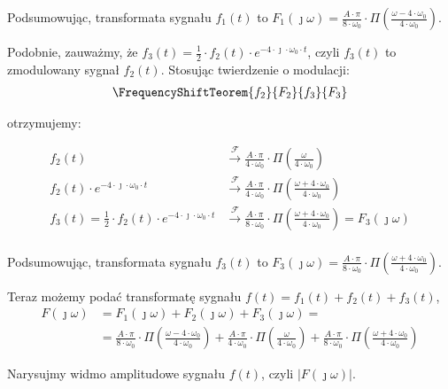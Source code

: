 \begin{task}
Podsumowując, transformata sygnału $f_1(t)$ to $F_1(\jmath \omega)= \frac{A \cdot \pi}{8 \cdot \omega_0} \cdot \Pi \left(\frac{\omega - 4 \cdot \omega_0}{4 \cdot \omega_0}\right)$.

Podobnie, zauważmy, że $f_3(t)=\frac{1}{2} \cdot f_2(t) \cdot e^{-4 \cdot \jmath \cdot \omega_0 \cdot t}$, czyli $f_3(t)$ to zmodulowany sygnał $f_2(t)$. Stosując twierdzenie o modulacji:
\begin{align*}
\FrequencyShiftTeorem{f_2}{F_2}{f_3}{F_3}
\end{align*}

otrzymujemy:

\begin{align*}
f_2(t) &\xrightarrow{\mathcal F} \frac{A \cdot \pi}{4 \cdot \omega_0} \cdot \Pi \left(\frac{\omega}{4 \cdot \omega_0}\right)\\
f_2(t) \cdot e^{-4 \cdot \jmath \cdot \omega_0 \cdot t} &\xrightarrow{\mathcal F} \frac{A \cdot \pi}{4 \cdot \omega_0} \cdot \Pi \left(\frac{\omega + 4 \cdot \omega_0}{4 \cdot \omega_0}\right)\\
f_3(t) = \frac{1}{2} \cdot f_2(t) \cdot e^{-4 \cdot \jmath \cdot \omega_0 \cdot t} &\xrightarrow{\mathcal F} \frac{A \cdot \pi}{8 \cdot \omega_0} \cdot \Pi \left(\frac{\omega + 4 \cdot \omega_0}{4 \cdot \omega_0}\right) = F_3(\jmath \omega)\\
\end{align*}

Podsumowując, transformata sygnału $f_3(t)$ to $F_3(\jmath \omega)= \frac{A \cdot \pi}{8 \cdot \omega_0} \cdot \Pi \left(\frac{\omega + 4 \cdot \omega_0}{4 \cdot \omega_0}\right)$.

Teraz możemy podać transformatę sygnału $f(t) = f_1(t)+f_2(t)+f_3(t)$,
\begin{align*}
F(\jmath \omega)&=F_1(\jmath \omega)+F_2(\jmath \omega)+F_3(\jmath \omega)=\\
&=\frac{A \cdot \pi}{8 \cdot \omega_0} \cdot \Pi \left(\frac{\omega - 4 \cdot \omega_0}{4 \cdot \omega_0}\right) + \frac{A \cdot \pi}{4 \cdot \omega_0} \cdot \Pi \left(\frac{\omega}{4 \cdot \omega_0}\right) + \frac{A \cdot \pi}{8 \cdot \omega_0} \cdot \Pi \left(\frac{\omega + 4 \cdot \omega_0}{4 \cdot \omega_0}\right)
\end{align*}

Narysujmy widmo amplitudowe sygnału $f(t)$, czyli $\left|F(\jmath \omega)\right|$.

\begin{figure}[H]
	\centering
\end{figure}
\end{task}

